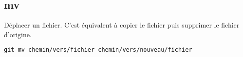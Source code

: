 \subsection*{mv}
Déplacer un fichier. C'est équivalent à copier le fichier puis supprimer le fichier d'origine.
\begin{verbatim}
git mv chemin/vers/fichier chemin/vers/nouveau/fichier
\end{verbatim}

